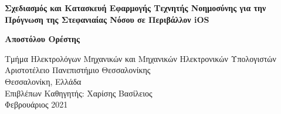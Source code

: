 \begin{titlepage}
    \begin{center}
        \vspace*{4cm}
        \huge
        \rmfamily
        \textbf{Σχεδιασμός και Κατασκευή Εφαρμογής Τεχνητής Νοημοσύνης για την Πρόγνωση της Στεφανιαίας Νόσου σε Περιβάλλον iOS }
        
        \vspace{0.5cm}
        
        \vspace{1.5cm}
        \LARGE
        \textbf{Αποστόλου Ορέστης}
        
        \vfill
        \large 
        \begin{flushleft}
        Τμήμα Ηλεκτρολόγων Μηχανικών και Μηχανικών Ηλεκτρονικών Υπολογιστών\\
        Αριστοτέλειο Πανεπιστήμιο Θεσσαλονίκης\\
        Θεσσαλονίκη, Ελλάδα\\
        Επιβλέπων Καθηγητής: Χαρίσης Βασίλειος\\
        Φεβρουάριος 2021
        \end{flushleft}
    \end{center}
\end{titlepage}
